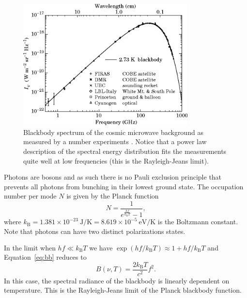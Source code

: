 \documentclass[a4paper,12pt]{article}
\theoremstyle{remark}
\newcommand{\mrm}[1]{\mathrm{#1}}
\renewcommand{\=}[1]{\stackrel{#1}{=}} %
\theoremstyle{plain}
\theoremstyle{definition}
\begin{document}
\begin{figure}[t]
\begin{center}
    \includegraphics*[angle=0,width=0.8\textwidth]{img/cmb_spectrum.png}
    \caption[Insert text]{Blackbody spectrum of the cosmic microwave background as measured by a number experiments \cite{Smoot1998}. Notice that a power law description of the spectral energy distribution fits the measurements quite well at low frequencies (this is the Rayleigh-Jeans limit).}
\label{fig:cmb_spectrum}
\end{center}
\end{figure}
 

Photons are bosons and as such there is no Pauli exclusion principle that prevents all photons from bunching in their lowest ground state. The occupation number per mode $N$ is given by the Planck function
\begin{equation}
N = \frac{1}{e^\frac{hf}{k_\mrm{B}T} - 1},
\end{equation}
where $k_\mrm{B} = 1.381 \times 10^{-23} \:\mrm{J/K} = 8.619 \times 10^{-5} \:\mrm{eV/K}$ is the Boltzmann constant. Note that photons can have two distinct polarizations states. 

In the limit when $hf \ll k_\mrm{B}T$ we have $\exp({hf/k_\mrm{B}T}) \approx 1 + hf/k_\mrm{B}T$ and Equation~\ref{eq:bb} reduces to
\begin{equation}
B(\nu, T) = \frac{2k_\mrm{B}T}{c^{2}}f^{2}.
\end{equation}
In this case, the spectral radiance of the blackbody is linearly dependent on temperature. This is the Rayleigh-Jeans limit of the Planck blackbody function.
\end{document}
